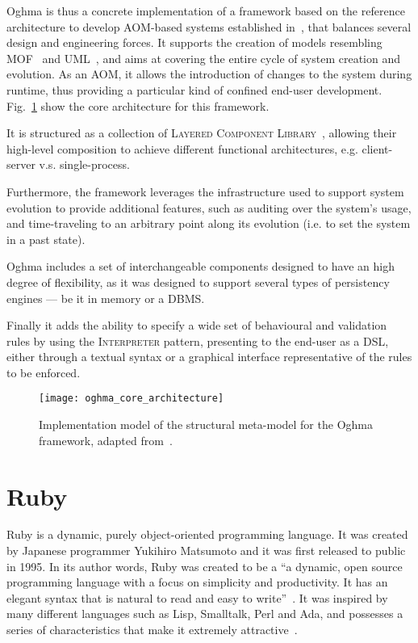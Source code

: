Oghma is thus a concrete implementation of a framework based on the reference architecture to develop AOM-based systems established in~\cite{ferreira_phd_2010}, that balances several design and engineering forces. It supports the creation of models resembling MOF~\cite{mof} and UML~\cite{uml}, and aims at covering the entire cycle of system creation and evolution. As an AOM, it allows the introduction of changes to the system during runtime, thus providing a particular kind of confined end-user development. Fig.~\ref{fig:oghma_core_architecture} show the core architecture for this framework.

It is structured as a collection of \textsc{Layered Component Library}~\cite{metaprogramming_metamodeling}, allowing their high-level composition to achieve different functional architectures, e.g. client-server v.s. single-process.

Furthermore, the framework leverages the infrastructure used to support system evolution to provide additional features, such as auditing over the system’s usage, and time-traveling to an arbitrary point along its evolution (i.e. to set the system in a past state).

Oghma includes a set of interchangeable components designed to have an high degree of flexibility, as it was designed to support several types of persistency engines --- be it in memory or a DBMS.

Finally it adds the ability to specify a wide set of behavioural and validation rules by using the \textsc{Interpreter} pattern\cite{gang_of_four}, presenting to the end-user as a  DSL, either through a textual syntax or a graphical interface representative of the rules to be enforced.

\begin{figure}[H]
  \centering
  \texttt{[image: oghma\_core\_architecture]}
  \caption[Implementation model of the structural meta-model for the Oghma framework]{Implementation model of the structural meta-model for the Oghma framework, adapted from~\cite{ferreira_phd_2010}.}
  \label{fig:oghma_core_architecture}
\end{figure}

\section{Ruby}\label{sec:ruby}

Ruby is a dynamic, purely object-oriented programming language. It was created by Japanese programmer Yukihiro Matsumoto and it was first released to public in 1995. In its author words, Ruby was created to be a ``a dynamic, open source programming language with a focus on simplicity and productivity. It has an elegant syntax that is natural to read and easy to write''~\cite{ruby}. It was inspired by many different languages such as Lisp, Smalltalk, Perl and Ada, and possesses a series of characteristics that make it extremely attractive~\cite{ruby}.


